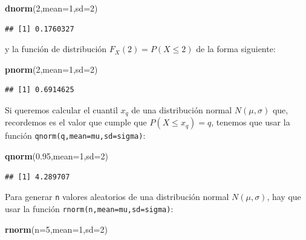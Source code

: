 \documentclass[]{book}
\newenvironment{Shaded}{\begin{snugshade}}{\end{snugshade}}
\newcommand{\DataTypeTok}[1]{\textcolor[rgb]{0.13,0.29,0.53}{#1}}
\newcommand{\DecValTok}[1]{\textcolor[rgb]{0.00,0.00,0.81}{#1}}
\newcommand{\FloatTok}[1]{\textcolor[rgb]{0.00,0.00,0.81}{#1}}
\newcommand{\KeywordTok}[1]{\textcolor[rgb]{0.13,0.29,0.53}{\textbf{#1}}}
\newcommand{\NormalTok}[1]{#1}
\begin{document}
\begin{Shaded}
\begin{Highlighting}[]
\KeywordTok{dnorm}\NormalTok{(}\DecValTok{2}\NormalTok{,}\DataTypeTok{mean=}\DecValTok{1}\NormalTok{,}\DataTypeTok{sd=}\DecValTok{2}\NormalTok{)}
\end{Highlighting}
\end{Shaded}

\begin{verbatim}
## [1] 0.1760327
\end{verbatim}

y la función de distribución \(F_X(2) = P(X\leq 2)\) de la forma siguiente:

\begin{Shaded}
\begin{Highlighting}[]
\KeywordTok{pnorm}\NormalTok{(}\DecValTok{2}\NormalTok{,}\DataTypeTok{mean=}\DecValTok{1}\NormalTok{,}\DataTypeTok{sd=}\DecValTok{2}\NormalTok{) }
\end{Highlighting}
\end{Shaded}

\begin{verbatim}
## [1] 0.6914625
\end{verbatim}

Si queremos calcular el cuantil \(x_{q}\) de una distribución normal \(N(\mu,\sigma)\) que, recordemos es el valor que cumple que \(P(X\leq x_{q})=q\), tenemos que usar la función \texttt{qnorm(q,mean=mu,sd=sigma)}:

\begin{Shaded}
\begin{Highlighting}[]
\KeywordTok{qnorm}\NormalTok{(}\FloatTok{0.95}\NormalTok{,}\DataTypeTok{mean=}\DecValTok{1}\NormalTok{,}\DataTypeTok{sd=}\DecValTok{2}\NormalTok{)}
\end{Highlighting}
\end{Shaded}

\begin{verbatim}
## [1] 4.289707
\end{verbatim}

Para generar \texttt{n} valores aleatorios de una distribución normal \(N(\mu,\sigma)\), hay que usar la función \texttt{rnorm(n,mean=mu,sd=sigma)}:

\begin{Shaded}
\begin{Highlighting}[]
\KeywordTok{rnorm}\NormalTok{(}\DataTypeTok{n=}\DecValTok{5}\NormalTok{,}\DataTypeTok{mean=}\DecValTok{1}\NormalTok{,}\DataTypeTok{sd=}\DecValTok{2}\NormalTok{)}
\end{Highlighting}
\end{Shaded}
\end{document}
